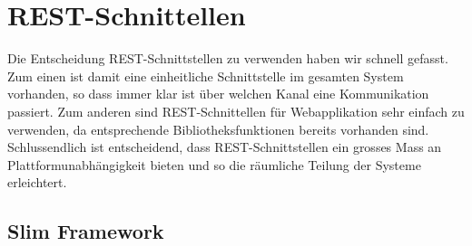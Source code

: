 \section{REST-Schnittellen}
Die Entscheidung \gls{REST}-Schnittstellen zu verwenden haben wir schnell gefasst. 
Zum einen ist damit eine einheitliche Schnittstelle im gesamten System vorhanden, so dass immer klar ist über welchen Kanal eine Kommunikation passiert.
Zum anderen sind \gls{REST}-Schnittellen für Webapplikation sehr einfach zu verwenden, da entsprechende Bibliotheksfunktionen bereits vorhanden sind.
Schlussendlich ist entscheidend, dass \gls{REST}-Schnittstellen ein grosses Mass an Plattformunabhängigkeit bieten und so die räumliche Teilung der Systeme erleichtert.

\subsection{Slim Framework}














